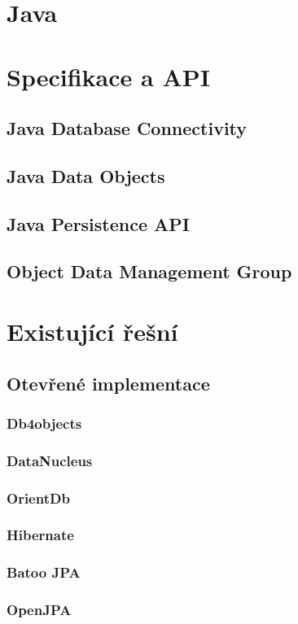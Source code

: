 
\section{Java}

\section{Specifikace a API}
\subsection{Java Database Connectivity}
\cite{fisher:jdbc,donahue:jdpb}
\subsection{Java Data Objects}
\cite{jordan:jdo,roos:jdo,tyagi:cjdo,ezzio:uujdo}
\subsection{Java Persistence API}
\cite{jpa:spec}
\subsection{Object Data Management Group}
\cite{odmg}
\section{Existující řešní}
\subsection{Otevřené implementace}
\subsubsection{Db4objects}
\subsubsection{DataNucleus}
\subsubsection{OrientDb}
\subsubsection{Hibernate}
\subsubsection{Batoo JPA}
\subsubsection{OpenJPA}
